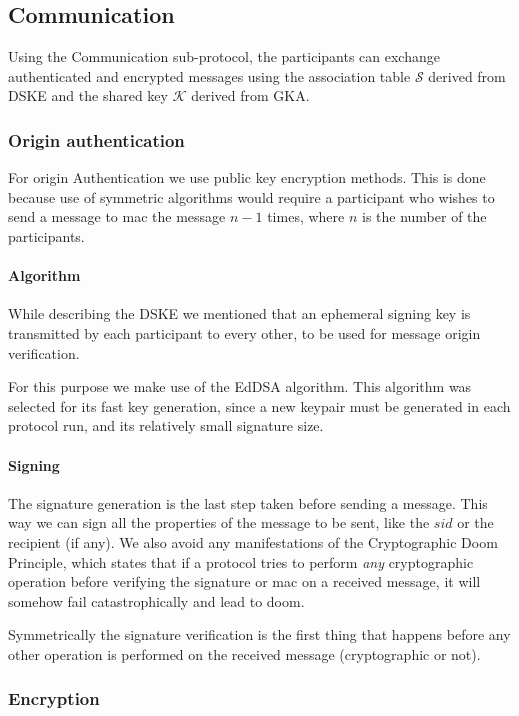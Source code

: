 \subsection{Communication}
\label{subsections:communication}
Using the Communication sub-protocol, the participants can exchange authenticated and encrypted messages using the association table $\mathcal{S}$ derived from DSKE and the shared key $\mathcal{K}$ derived from GKA.

\subsubsection{Origin authentication}
For origin Authentication we use public key encryption methods. This is done because use of symmetric algorithms would require a participant who wishes to send a message to mac the message $n-1$ times, where $n$ is the number of the participants.

\paragraph{Algorithm}
While describing the DSKE we mentioned that an ephemeral signing key is transmitted by each participant to every other, to be used for message origin verification.

For this purpose we make use of the EdDSA algorithm. This algorithm was selected for its fast key generation, since a new keypair must be generated in each protocol run, and its relatively small signature size.

\paragraph{Signing}
\label{signing}
The signature generation is the last step taken before sending a message. This
way we can sign all the properties of the message to be sent, like the $sid$ or the
recipient (if any). We also avoid any manifestations of the Cryptographic Doom
Principle, which states that if a protocol tries to perform \emph{any}
cryptographic operation before verifying the signature or mac on a received
message, it will somehow fail catastrophically and lead to doom.

Symmetrically the signature verification is the first thing that happens before
any other operation is performed on the received message (cryptographic or not).

\subsubsection{Encryption}

